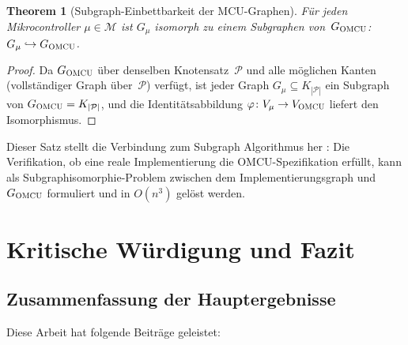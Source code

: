 ﻿\documentclass[12pt, a4paper]{article}
\theoremstyle{plain}
\newtheorem{theorem}{Theorem}[section]
\theoremstyle{definition}
\theoremstyle{remark}
\newcommand{\omcu}{\textsc{OMCU}}
\begin{document}
\begin{theorem}[Subgraph-Einbettbarkeit der MCU-Graphen]
\label{thm:subgraph}
  Für jeden Mikrocontroller $\mu \in \mathcal{M}$ ist $G_\mu$
  isomorph zu einem Subgraphen von~$G_{\omcu{}}$:
  $G_\mu \hookrightarrow G_{\omcu{}}$.
\end{theorem}

\begin{proof}
  Da $G_{\omcu{}}$ über denselben Knotensatz~$\mathcal{P}$ und alle
  möglichen Kanten (vollständiger Graph über~$\mathcal{P}$) verfügt,
  ist jeder Graph $G_\mu \subseteq K_{|\mathcal{P}|}$ ein Subgraph von
  $G_{\omcu{}} = K_{|\mathcal{P}|}$, und die Identitätsabbildung
  $\varphi\colon V_\mu \to V_{\omcu{}}$ liefert den Isomorphismus.
 
\end{proof}

Dieser Satz stellt die Verbindung zum Subgraph Algorithmus her
\cite{epp_subgraph2026}:
Die Verifikation, ob eine reale Implementierung die OMCU-Spezifikation
erfüllt, kann als Subgraphiso\-morphie-Problem zwischen dem
Implementierungsgraph und~$G_{\omcu{}}$ formuliert und in
$O(n^3)$ gelöst werden.

\section{Kritische Würdigung und Fazit}
\label{sec:fazit}

\subsection{Zusammenfassung der Hauptergebnisse}

Diese Arbeit hat folgende Beiträge geleistet:
\end{document}
